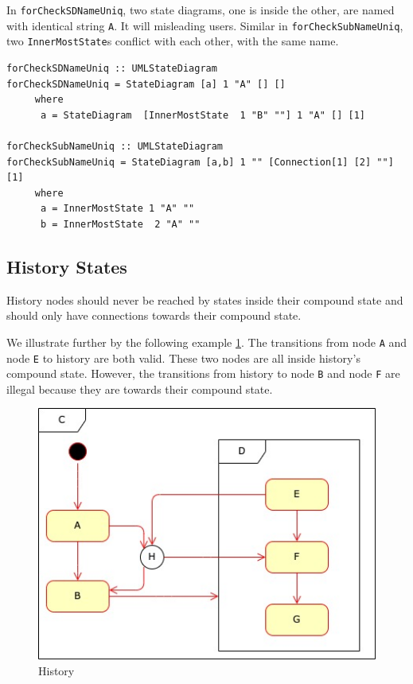 In \verb|forCheckSDNameUniq|,  two state diagrams, one is inside the other, are named with identical string \verb|A|. It will misleading users. 
Similar in \verb|forCheckSubNameUniq|,  two \verb|InnerMostState|s conflict with each other,  with the same name.

\begin{verbatim}
forCheckSDNameUniq :: UMLStateDiagram
forCheckSDNameUniq = StateDiagram [a] 1 "A" [] []
     where
      a = StateDiagram  [InnerMostState  1 "B" ""] 1 "A" [] [1]

forCheckSubNameUniq :: UMLStateDiagram
forCheckSubNameUniq = StateDiagram [a,b] 1 "" [Connection[1] [2] ""] [1]
     where
      a = InnerMostState 1 "A" ""
      b = InnerMostState  2 "A" ""  
\end{verbatim}



\subsection{History States}
\label{sec:representation}
History nodes should never be reached by states inside their compound state and should only have connections towards their compound state.

We illustrate further by the following example \ref{fig:history}. 
The transitions from node \verb|A| and node \verb|E| to history are both valid. These two nodes are all inside history's compound state. However, the transitions from history to node \verb|B| and node \verb|F| are illegal because they are towards their compound state.

\begin{figure}[ht]
    \centering
    \includegraphics[scale=0.5]{Bilder/history.jpg}
    \caption{History}
    \label{fig:history}
\end{figure}

